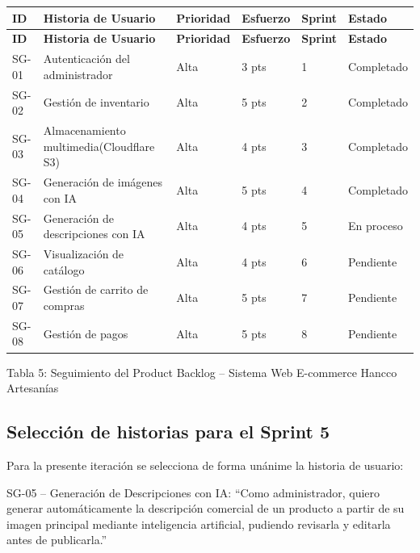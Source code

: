 \documentclass[12pt,a4paper]{article}
\begin{document}
{\small
\begin{longtable}{p{1.2cm} p{6.8cm} p{1.6cm} p{1.8cm} p{1.4cm} p{2.2cm}}
\toprule
\textbf{ID} & \textbf{Historia de Usuario} & \textbf{Prioridad} & \textbf{Esfuerzo} & \textbf{Sprint} & \textbf{Estado} \\
\midrule
\endfirsthead

\toprule
\textbf{ID} & \textbf{Historia de Usuario} & \textbf{Prioridad} & \textbf{Esfuerzo} & \textbf{Sprint} & \textbf{Estado} \\
\midrule
\endhead

\bottomrule
\endlastfoot

SG-01 & Autenticación del administrador & Alta & 3 pts & 1 & Completado \\
SG-02 & Gestión de inventario & Alta & 5 pts & 2 & Completado \\
SG-03 & Almacenamiento multimedia(Cloudflare S3) & Alta & 4 pts & 3 & Completado \\
SG-04 & Generación de imágenes con IA & Alta & 5 pts & 4 & Completado \\
SG-05 & Generación de descripciones con IA & Alta & 4 pts & 5 & En proceso \\
SG-06 & Visualización de catálogo & Alta & 4 pts & 6 & Pendiente \\
SG-07 & Gestión de carrito de compras & Alta & 5 pts & 7 & Pendiente \\
SG-08 & Gestión de pagos & Alta & 5 pts & 8 & Pendiente \\

\end{longtable}
}

\begin{center}
\small Tabla 5: Seguimiento del Product Backlog -- Sistema Web E-commerce Hancco Artesanías
\end{center}

\subsection*{Selección de historias para el Sprint 5}

Para la presente iteración se selecciona de forma unánime la historia de usuario:

SG-05 -- Generación de Descripciones con IA: ``Como administrador, quiero generar automáticamente la descripción comercial de un producto a partir de su imagen principal mediante inteligencia artificial, pudiendo revisarla y editarla antes de publicarla.''
\end{document}
